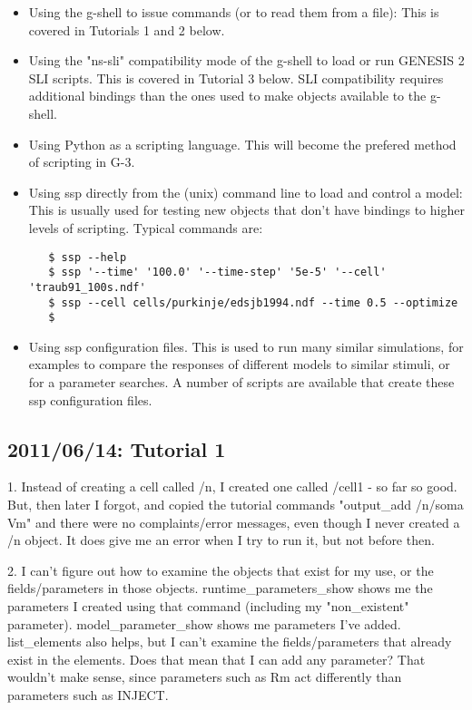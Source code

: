 \documentclass[12pt]{article}
\begin{document}
\begin{itemize}
\item Using the g-shell to issue commands (or to read them from a
  file): This is covered in Tutorials 1 and 2 below.

\item Using the "ns-sli" compatibility mode of the g-shell to load or
  run GENESIS 2 SLI scripts.  This is covered in Tutorial 3 below.
  SLI compatibility requires additional bindings than the ones used to
  make objects available to the g-shell.

\item Using Python as a scripting language.  This will become the
  prefered method of scripting in G-3.

\item Using ssp directly from the (unix) command line to load and
  control a model: This is usually used for testing new objects that
  don't have bindings to higher levels of scripting.  Typical commands
  are:

\begin{verbatim}
   $ ssp --help
   $ ssp '--time' '100.0' '--time-step' '5e-5' '--cell' 'traub91_100s.ndf'
   $ ssp --cell cells/purkinje/edsjb1994.ndf --time 0.5 --optimize
   $
\end{verbatim}

\item Using ssp configuration files.  This is used to run many similar
  simulations, for examples to compare the responses of different
  models to similar stimuli, or for a parameter searches.  A number of
  scripts are available that create these ssp configuration files.
\end{itemize}


\subsection{2011/06/14: Tutorial 1}

1. Instead of creating a cell called /n, I created one called /cell1 -
so far so good.  But, then later I forgot, and copied the tutorial
commands "output\_add /n/soma Vm" and there were no complaints/error
messages, even though I never created a /n object. It does give me an
error when I try to run it, but not before then.

2. I can't figure out how to examine the objects that exist for my
use, or the fields/parameters in those objects.
runtime\_parameters\_show shows me the parameters I created using that
command (including my "non\_existent" parameter). model\_parameter\_show
shows me parameters I've added.  list\_elements also helps, but I can't
examine the fields/parameters that already exist in the elements. Does
that mean that I can add any parameter?  That wouldn't make sense,
since parameters such as Rm act differently than parameters such as
INJECT.
\end{document}
